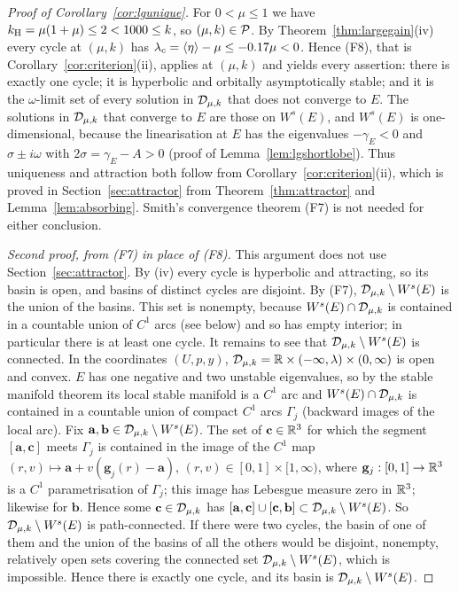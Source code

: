 \begin{proof}[Proof of Corollary~\ref{cor:lgunique}]
For $0<\mu\le1$ we have $k_{\mathrm H}=\mu(1+\mu)\le2<1000\le k$, so $(\mu,k)\in\mathcal P$. By Theorem~\ref{thm:largegain}(iv) every cycle at $(\mu,k)$ has $\lambda_c=\left\langle \eta\right\rangle-\mu\le-0.17\mu<0$. Hence (F8), that is Corollary~\ref{cor:criterion}(ii), applies at $(\mu,k)$ and yields every assertion: there is exactly one cycle; it is hyperbolic and orbitally asymptotically stable; and it is the $\omega$-limit set of every solution in $\mathcal D_{\mu,k}$ that does not converge to $E$. The solutions in $\mathcal D_{\mu,k}$ that converge to $E$ are those on $W^s(E)$, and $W^s(E)$ is one-dimensional, because the linearisation at $E$ has the eigenvalues $-\gamma_E<0$ and $\sigma\pm i\omega$ with $2\sigma=\gamma_E-A>0$ (proof of Lemma~\ref{lem:lgshortlobe}). Thus uniqueness and attraction both follow from Corollary~\ref{cor:criterion}(ii), which is proved in Section~\ref{sec:attractor} from Theorem~\ref{thm:attractor} and Lemma~\ref{lem:absorbing}. Smith's convergence theorem (F7) is not needed for either conclusion.

\emph{Second proof, from \textup{(F7)} in place of \textup{(F8)}.} This argument does not use Section~\ref{sec:attractor}.
By (iv) every cycle is hyperbolic and attracting, so its basin is open, and basins of distinct cycles
are disjoint. By (F7), $\mathcal D_{\mu,k}\setminus W^s(E)$ is the union of the basins. This set is nonempty, because $W^s(E)\cap\mathcal D_{\mu,k}$ is contained in a countable union of $C^1$ arcs (see below) and so has empty interior; in particular there is at
least one cycle. It remains to see that $\mathcal D_{\mu,k}\setminus W^s(E)$ is connected. In the coordinates
$(U,p,y)$, $\mathcal D_{\mu,k}=\mathbb R\times(-\infty,\lambda)\times(0,\infty)$ is open and convex. $E$ has one
negative and two unstable eigenvalues, so by the stable manifold theorem its local stable manifold is a
$C^1$ arc and $W^s(E)\cap\mathcal D_{\mu,k}$ is contained in a countable union of compact $C^1$ arcs $\Gamma_j$
(backward images of the local arc). Fix $\mathbf a,\mathbf b\in\mathcal D_{\mu,k}\setminus W^s(E)$. The set of $\mathbf c\in\mathbb R^3$
for which the segment $[\mathbf a,\mathbf c]$ meets $\Gamma_j$ is contained in the image of the $C^1$ map
$(r,v)\mapsto\mathbf a+v(\mathbf g_j(r)-\mathbf a)$, $(r,v)\in[0,1]\times[1,\infty)$, where $\mathbf g_j:[0,1]\to\mathbb R^3$ is a $C^1$ parametrisation of $\Gamma_j$; this image has Lebesgue measure zero in
$\mathbb R^3$; likewise for $\mathbf b$. Hence some $\mathbf c\in\mathcal D_{\mu,k}$ has
$[\mathbf a,\mathbf c]\cup[\mathbf c,\mathbf b]\subset\mathcal D_{\mu,k}\setminus W^s(E)$. So $\mathcal D_{\mu,k}\setminus W^s(E)$ is path-connected. If there were two cycles, the basin of one of them and the union of the basins of all the others would be disjoint, nonempty, relatively open sets covering the connected set $\mathcal D_{\mu,k}\setminus W^s(E)$, which is impossible. Hence there is exactly one cycle, and its basin
is $\mathcal D_{\mu,k}\setminus W^s(E)$.
\end{proof}

